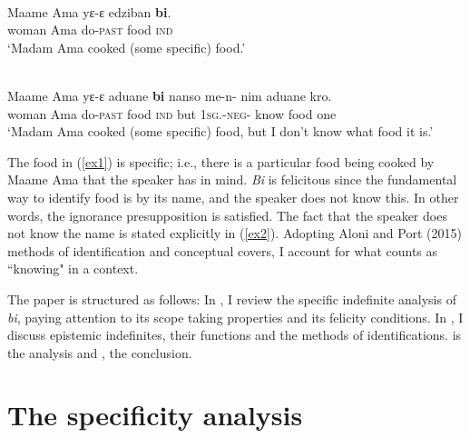 \documentclass[output=paper,modfonts]{langsci/langscibook}
\begin{document}
\ea 
{}\\
\ea\label{ex1}

\gll Maame Ama yε-ε edziban \textbf{bi}. \\
     woman Ama do-\textsc{past} food  \textsc{ind}   \\
\glt `Madam Ama cooked (some specific) food.'

\ex\label{ex2}
\\
\gll  Maame Ama yε-ε aduane \textbf{bi} nanso me-n- nim aduane kro. \\
     woman Ama do-\textsc{past} food  \textsc{ind} but \textsc{1sg.}-\textsc{neg}- know food one \\ 
     \glt `Madam Ama cooked (some specific) food, but I don't know what food it is.'
     
\z \z 

The food in (\ref{ex1}) is specific; i.e., there is a particular food being cooked by Maame Ama that the speaker has in mind. \emph{Bi} is felicitous since the fundamental way to identify food is by its name, and the speaker does not know this. In other words, the ignorance presupposition is satisfied. The fact that the speaker does not know the name is stated explicitly in (\ref{ex2}). Adopting Aloni and Port (2015) methods of identification and conceptual covers, I account for what counts as ``knowing" in a context.

The paper is structured as follows: In , I review the specific indefinite analysis of \emph{bi}, paying attention to its scope taking properties and its felicity conditions. In , I discuss epistemic indefinites, their functions and the methods of identifications.   is the analysis and , the conclusion.  


\section{The specificity analysis}
 
\end{document}
